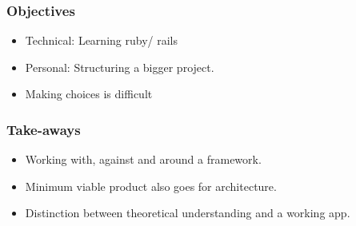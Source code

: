 \documentclass[17pt]{beamer}
\begin{document}
	\begin{frame}
		\frametitle{Objectives}
		\begin{itemize}
		\item Technical: Learning ruby/ rails
		\item Personal: Structuring a bigger project.
		\item Making choices is difficult
		\end{itemize}
	\end{frame}
	\begin{frame}
		\frametitle{Take-aways}
		\begin{itemize}
		\item Working with, against and around a framework.
		\item Minimum viable product also goes for architecture.
		\item Distinction between theoretical understanding and a working app.
		\end{itemize}
	
		
	\end{frame}
\end{document}
